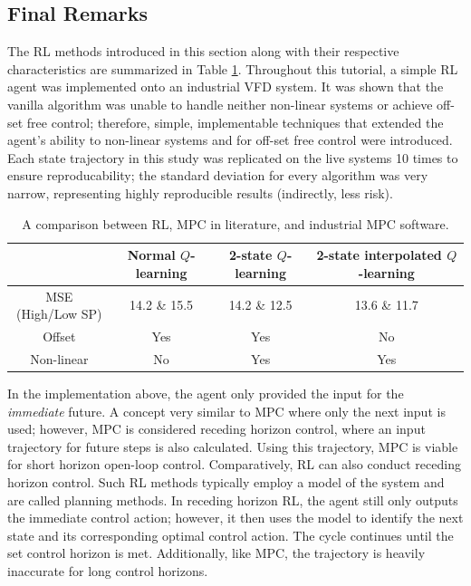 \subsection{Final Remarks}
The RL methods introduced in this section along with their respective characteristics are summarized in Table \ref{tab:system1_info}. Throughout this tutorial, a simple RL agent was implemented onto an industrial VFD system. It was shown that the vanilla algorithm was unable to handle neither non-linear systems or achieve off-set free control; therefore, simple, implementable techniques that extended the agent's ability to non-linear systems and for off-set free control were introduced. Each state trajectory in this study was replicated on the live systems 10 times to ensure reproducability; the standard deviation for every algorithm was very narrow, representing highly reproducible results (indirectly, less risk).

\begin{table}[H]
\caption{A comparison between RL, MPC in literature, and industrial MPC software.}
\label{tab:system1_info}
\centering
{\scriptsize
\begin{tabular}{c|c|c|c}
 & \textbf{Normal $Q$-learning}	& \textbf{2-state $Q$-learning} & \textbf{2-state interpolated $Q$-learning}\\
 \hline
MSE (High/Low SP)   & 14.2 \& 15.5	& 14.2 \& 12.5   &  13.6 \& 11.7 \\
Offset		& Yes			&  Yes   &  No \\
Non-linear		& No			& Yes   &  Yes \\
\end{tabular}}
\end{table}

In the implementation above, the agent only provided the input for the \textit{immediate} future. A concept very similar to MPC where only the next input is used; however, MPC is considered receding horizon control, where an input trajectory for future steps is also calculated.  Using this trajectory, MPC is viable for short horizon open-loop control.  Comparatively, RL can also conduct receding horizon control. Such RL methods typically employ a model of the system and are called planning methods.  In receding horizon RL, the agent still only outputs the immediate control action; however, it then uses the model to identify the next state and its corresponding optimal control action. The cycle continues until the set control horizon is met.  Additionally, like MPC, the trajectory is heavily inaccurate for long control horizons.

